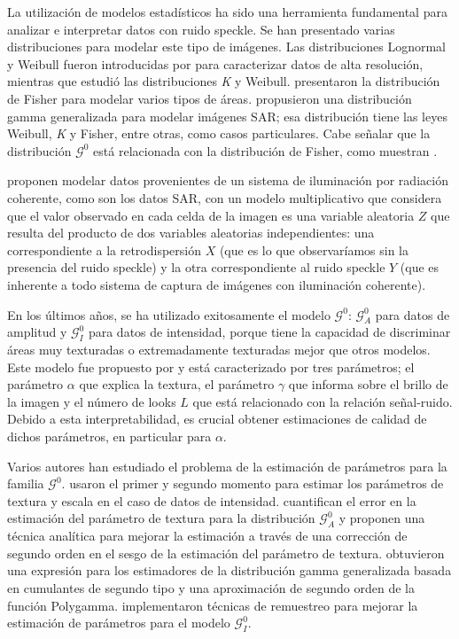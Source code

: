 La utilización de modelos estadísticos ha sido una herramienta fundamental para analizar e interpretar datos con ruido speckle. 
Se han presentado varias distribuciones para modelar este tipo de imágenes. Las distribuciones Lognormal y Weibull fueron introducidas por \citet{oliverquegan98} para caracterizar datos de alta resolución, mientras que \citet{Oliver1993} estudió las distribuciones \textit{K} y Weibull. 
\citet{Tison2004} presentaron la distribución de Fisher para modelar varios tipos de áreas. 
\citet{Li2011} propusieron una distribución gamma generalizada para modelar imágenes SAR; esa distribución tiene las leyes Weibull, \textit{K} y Fisher, entre otras, como casos particulares. 
Cabe señalar que la distribución $\mathcal{G}^0$ está relacionada con la distribución de Fisher, como muestran \citet{MejailJacoboFreryBustos:IJRS}.

\citet{oliverquegan98} proponen modelar datos provenientes de un sistema de iluminación por radiación coherente, como son los datos SAR, con un modelo multiplicativo que considera que el valor observado en cada celda de la imagen es una variable aleatoria $Z$ que resulta del producto de dos variables aleatorias independientes: una correspondiente a la retrodispersión $X$ (que es lo que observaríamos sin la presencia del ruido speckle) y la otra correspondiente al ruido speckle $Y$ (que es inherente a todo sistema de captura de imágenes con iluminación coherente). 

En los últimos años, se ha utilizado exitosamente el modelo $\mathcal{G}^0$: $\mathcal{G}_A^0$ para datos de amplitud y $\mathcal G_I^0$ para datos de intensidad, porque tiene la capacidad de discriminar áreas muy texturadas o extremadamente texturadas mejor que otros modelos. Este modelo fue propuesto por \citet{Frery97} y está caracterizado por tres parámetros; el parámetro $\alpha$ que explica la textura, el parámetro $\gamma $ que informa sobre el brillo de la imagen y el número de looks $L$ que está relacionado con la relación señal-ruido.
Debido a esta interpretabilidad, es crucial obtener estimaciones de calidad de dichos parámetros, en particular para $\alpha$.

Varios autores han estudiado el problema de la estimación de parámetros para la familia $\mathcal G^0$. \citet{Freitas2005} usaron el primer y segundo momento para estimar los parámetros de textura y escala en el caso de datos de intensidad.
\citet{VasconcellosFrerySilva:CompStat} cuantifican el error en la estimación del parámetro de textura para la distribución $\mathcal G_A^0$ y proponen una técnica analítica para mejorar la estimación a través de una corrección de segundo orden en el sesgo de la estimación del parámetro de textura. \citet{Li2011} obtuvieron una expresión para los estimadores de la distribución gamma generalizada basada en cumulantes de segundo tipo y una aproximación de segundo orden de la función Polygamma. \citet{CribariFrerySilva:CSDA} implementaron técnicas de remuestreo para mejorar la estimación de parámetros para el modelo $\mathcal G_I^0$.

